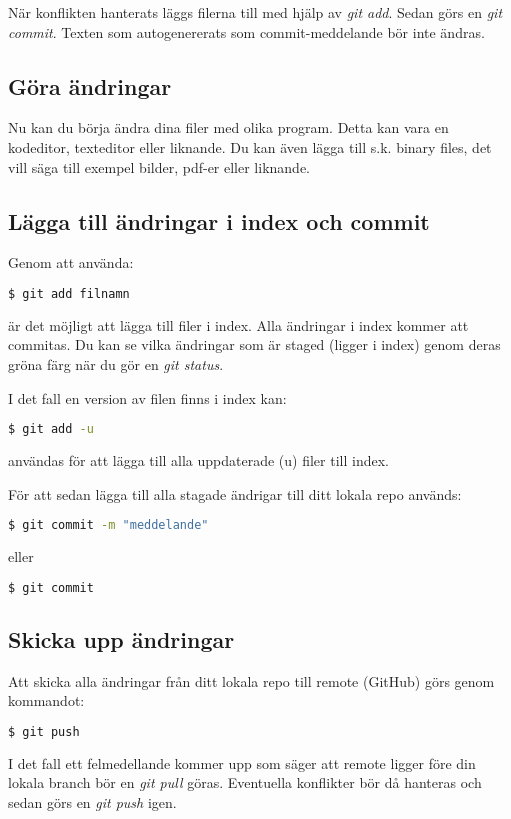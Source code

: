 \documentclass[a4paper]{article}
\begin{document}
När konflikten hanterats läggs filerna till med hjälp av \emph{git add}.
Sedan görs en \emph{git commit}.
Texten som autogenererats som commit-meddelande bör inte ändras.

\subsection{Göra ändringar}
Nu kan du börja ändra dina filer med olika program.
Detta kan vara en kodeditor, texteditor eller liknande.
Du kan även lägga till s.k. binary files, det vill säga till exempel bilder, pdf-er eller liknande.

\subsection{Lägga till ändringar i index och commit}
Genom att använda:
\begin{lstlisting}[language=bash]
    $ git add filnamn
\end{lstlisting}
är det möjligt att lägga till filer i index.
Alla ändringar i index kommer att commitas.
Du kan se vilka ändringar som är staged (ligger i index) genom deras gröna färg när du gör en \emph{git status}.

I det fall en version av filen finns i index kan:
\begin{lstlisting}[language=bash]
    $ git add -u
\end{lstlisting}
användas för att lägga till alla uppdaterade (u) filer till index.

För att sedan lägga till alla stagade ändrigar till ditt lokala repo används:
\begin{lstlisting}[language=bash]
    $ git commit -m "meddelande"
\end{lstlisting}
eller
\begin{lstlisting}[language=bash]
    $ git commit
\end{lstlisting}

\subsection{Skicka upp ändringar}
Att skicka alla ändringar från ditt lokala repo till remote (GitHub) görs genom kommandot:
\begin{lstlisting}[language=bash]
    $ git push
\end{lstlisting}
I det fall ett felmedellande kommer upp som säger att remote ligger före din lokala branch bör en \emph{git pull} göras.
Eventuella konflikter bör då hanteras och sedan görs en \emph{git push} igen.
\end{document}
